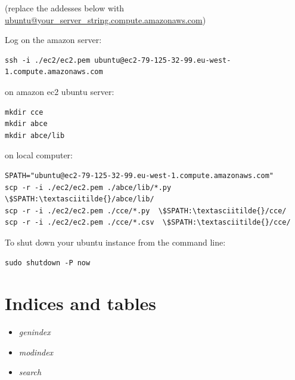\documentclass[letterpaper,10pt,english]{sphinxmanual}
\begin{document}
(replace the addesses below with \href{mailto:ubuntu@your\_server\_string.compute.amazonaws.com}{ubuntu@your\_server\_string.compute.amazonaws.com})

Log on the amazon server:

\begin{Verbatim}[commandchars=\\\{\}]
ssh -i ./ec2/ec2.pem ubuntu@ec2-79-125-32-99.eu-west-1.compute.amazonaws.com
\end{Verbatim}

on amazon ec2 ubuntu server:

\begin{Verbatim}[commandchars=\\\{\}]
mkdir cce
mkdir abce
mkdir abce/lib
\end{Verbatim}

on local computer:

\begin{Verbatim}[commandchars=\\\{\}]
SPATH="ubuntu@ec2-79-125-32-99.eu-west-1.compute.amazonaws.com"
scp -r -i ./ec2/ec2.pem ./abce/lib/*.py  \$SPATH:\textasciitilde{}/abce/lib/
scp -r -i ./ec2/ec2.pem ./cce/*.py  \$SPATH:\textasciitilde{}/cce/
scp -r -i ./ec2/ec2.pem ./cce/*.csv  \$SPATH:\textasciitilde{}/cce/
\end{Verbatim}

To shut down your ubuntu instance from the command line:

\begin{Verbatim}[commandchars=\\\{\}]
sudo shutdown -P now
\end{Verbatim}



\chapter{Indices and tables}
\label{index:indices-and-tables}\begin{itemize}
\item {} 
\emph{genindex}

\item {} 
\emph{modindex}

\item {} 
\emph{search}

\end{itemize}
\end{document}
